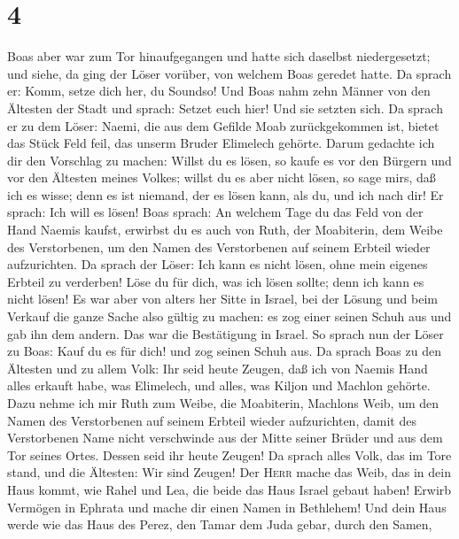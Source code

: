 \hypertarget{section-3}{%
\section{4}\label{section-3}}

 Boas aber war zum Tor hinaufgegangen und hatte sich
daselbst niedergesetzt; und siehe, da ging der Löser vorüber, von
welchem Boas geredet hatte. Da sprach er: Komm, setze dich her, du
Soundso!  Und Boas nahm zehn Männer von den Ältesten der
Stadt und sprach: Setzet euch hier! Und sie setzten sich. 
Da sprach er zu dem Löser: Naemi, die aus dem Gefilde Moab
zurückgekommen ist, bietet das Stück Feld feil, das unserm Bruder
Elimelech gehörte.  Darum gedachte ich dir den Vorschlag
zu machen: Willst du es lösen, so kaufe es vor den Bürgern und vor den
Ältesten meines Volkes; willst du es aber nicht lösen, so sage
mir\textquotesingle s, daß ich es wisse; denn es ist niemand, der es
lösen kann, als du, und ich nach dir!  Er sprach: Ich will
es lösen! Boas sprach: An welchem Tage du das Feld von der Hand Naemis
kaufst, erwirbst du es auch von Ruth, der Moabiterin, dem Weibe des
Verstorbenen, um den Namen des Verstorbenen auf seinem Erbteil wieder
aufzurichten.  Da sprach der Löser: Ich kann es nicht
lösen, ohne mein eigenes Erbteil zu verderben! Löse du für dich, was ich
lösen sollte; denn ich kann es nicht lösen!  Es war aber
von alters her Sitte in Israel, bei der Lösung und beim Verkauf die
ganze Sache also gültig zu machen: es zog einer seinen Schuh aus und gab
ihn dem andern. Das war die Bestätigung in Israel.  So
sprach nun der Löser zu Boas: Kauf du es für dich! und zog seinen Schuh
aus.  Da sprach Boas zu den Ältesten und zu allem Volk:
Ihr seid heute Zeugen, daß ich von Naemis Hand alles erkauft habe, was
Elimelech, und alles, was Kiljon und Machlon gehörte. 
Dazu nehme ich mir Ruth zum Weibe, die Moabiterin, Machlons Weib, um den
Namen des Verstorbenen auf seinem Erbteil wieder aufzurichten, damit des
Verstorbenen Name nicht verschwinde aus der Mitte seiner Brüder und aus
dem Tor seines Ortes. Dessen seid ihr heute Zeugen!  Da
sprach alles Volk, das im Tore stand, und die Ältesten: Wir sind Zeugen!
Der \textsc{Herr} mache das Weib, das in dein Haus kommt, wie Rahel und
Lea, die beide das Haus Israel gebaut haben! Erwirb Vermögen in Ephrata
und mache dir einen Namen in Bethlehem!  Und dein Haus
werde wie das Haus des Perez, den Tamar dem Juda gebar, durch den Samen,
